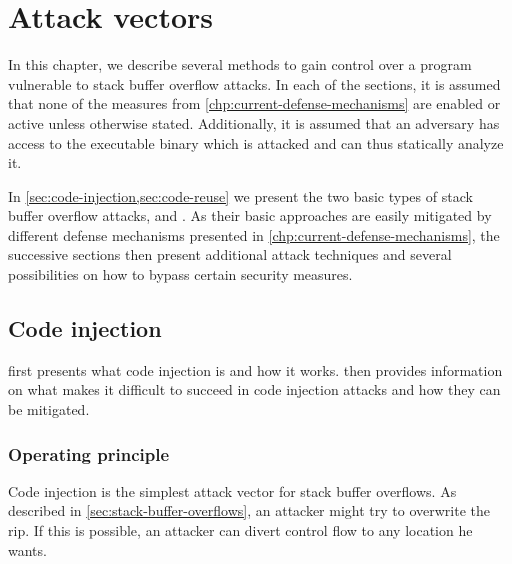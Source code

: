 \chapter{Attack vectors}
\label{chp:attack-vectors}

In this chapter, we describe several methods to gain control over a program vulnerable to stack buffer overflow attacks.
In each of the sections, it is assumed that none of the measures from \cref{chp:current-defense-mechanisms} are enabled or active unless otherwise stated.
Additionally, it is assumed that an adversary has access to the executable binary which is attacked and can thus statically analyze it.

In \cref{sec:code-injection,sec:code-reuse} we present the two basic types of stack buffer overflow attacks,  and .
As their basic approaches are easily mitigated by different defense mechanisms presented in \cref{chp:current-defense-mechanisms}, the successive sections then present additional attack techniques and several possibilities on how to bypass certain security measures.


\section{Code injection}
\label{sec:code-injection}

 first presents what code injection is and how it works.
 then provides information on what makes it difficult to succeed in code injection attacks and how they can be mitigated.

\subsection{Operating principle}
\label{subsec:ci-operating-principle}

Code injection is the simplest attack vector for stack buffer overflows.
As described in \cref{sec:stack-buffer-overflows}, an attacker might try to overwrite the \gls{rip}.
If this is possible, an attacker can divert control flow to any location he wants.

